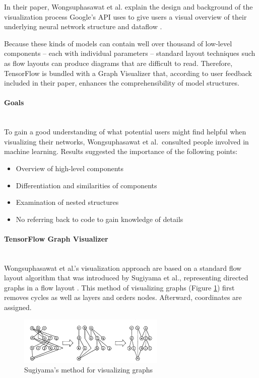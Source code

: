 \documentclass{acmsiggraph}               %
\newcommand{\paragraphbr}[1]{\paragraph{#1}\mbox{}\\}
\begin{document}
In their paper, Wongsuphasawat et al. explain the design and background of the visualization process Google's API uses to give users a visual overview of their underlying neural network structure and dataflow \cite{Wongsuphasawat2018}.

Because these kinds of models can contain well over thousand of low-level components -- each with individual parameters -- standard layout techniques such as flow layouts can produce diagrams that are difficult to read. Therefore, TensorFlow is bundled with a Graph Visualizer that, according to user feedback included in their paper, enhances the comprehensibility of model structures.

\paragraphbr{Goals}

To gain a good understanding of what potential users might find helpful when visualizing their networks, Wongsuphasawat et al.~consulted people involved in machine learning. Results suggested the importance of the following points:

\begin{itemize}
  \setlength\itemsep{0em}
  \item Overview of high-level components
  \item Differentiation and similarities of components
  \item Examination of nested structures
  \item No referring back to code to gain knowledge of details
\end{itemize}

\paragraphbr{TensorFlow Graph Visualizer}

Wongsuphasawat et al.'s visualization approach are based on a standard flow layout algorithm that was introduced by Sugiyama et al., representing directed graphs in a flow layout \cite{Sugiyama1981}. This method of visualizing graphs (Figure \ref{fig:sugiyama_method}) first removes cycles as well as layers and orders nodes. Afterward, coordinates are assigned.

\begin{figure}[H]
\includegraphics[width=2.75in]{sugiyama_method_sugiyama_et_al}
\caption{Sugiyama's method for visualizing graphs \protect\cite{Sugiyama1981}}
\label{fig:sugiyama_method}
\centering
\end{figure}
\end{document}
